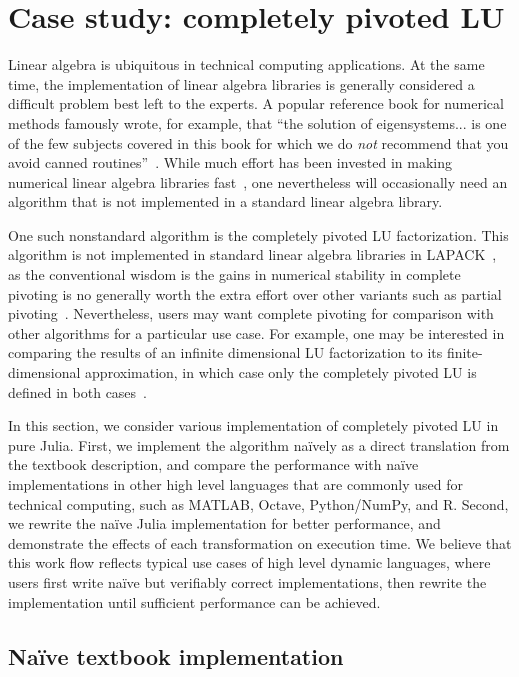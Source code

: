 \section{Case study: completely pivoted LU}

Linear algebra is ubiquitous in technical computing applications. At the same
time, the implementation of linear algebra libraries is generally considered a
difficult problem best left to the experts. A popular reference book for
numerical methods famously wrote, for example, that ``the solution of
eigensystems... is one of the few subjects covered in this book for which we do
\textit{not} recommend that you avoid canned routines''~\cite[Section 11.0, p.
461]{Press1992}. While much effort has been invested in making
numerical linear algebra libraries
fast~\cite{LAPACK,Gunnels2001,OpenBLAS,VanZee2013}, one nevertheless will
occasionally need an algorithm that is not implemented in a
standard linear algebra library.

One such nonstandard algorithm is the completely pivoted LU factorization. This
algorithm is not implemented in standard linear algebra libraries in
LAPACK~\cite{LAPACK}, as the conventional wisdom is the gains in numerical
stability in complete pivoting is no generally worth the extra effort over
other variants such as partial pivoting~\cite{Golub2013}.  Nevertheless, users
may want complete pivoting for comparison with other algorithms for a
particular use case. For example, one may be interested in comparing the
results of an infinite dimensional LU factorization to its finite-dimensional
approximation, in which case only the completely pivoted LU is defined in both
cases~\cite{Townsend2014}.

In this section, we consider various implementation of completely pivoted LU in
pure Julia. First, we implement the algorithm na\"ively as a direct translation
from the textbook description, and compare the performance with na\"ive
implementations in other high level languages that are commonly used for
technical computing, such as MATLAB, Octave, Python/NumPy, and R. Second, we
rewrite the na\"ive Julia implementation for better performance, and
demonstrate the effects of each transformation on execution time. We believe
that this work flow reflects typical use cases of high level dynamic languages,
where users first write na\"ive but verifiably correct implementations, then
rewrite the implementation until sufficient performance can be achieved.



\subsection{Na\"ive textbook implementation}

